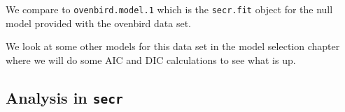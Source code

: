 We compare to {\tt ovenbird.model.1} which is the \mbox{\tt secr.fit}
object for the null model provided with the ovenbird data set. 

We look at some other models for this data set in the model selection
chapter where we will do some AIC and DIC calculations to see what is up.


\subsection{Analysis in \mbox{\tt secr} }

